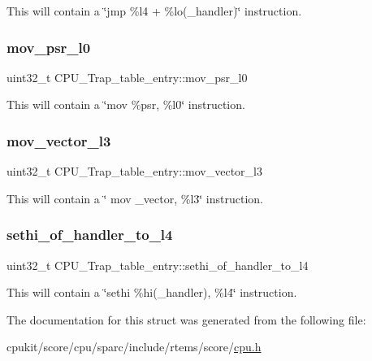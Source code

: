 This will contain a \char`\"{}jmp \%l4 + \%lo(\+\_\+handler)\char`\"{} instruction. \mbox{\label{structCPU__Trap__table__entry_a7b5bf63979937f0faab4c9c98f5e4e81}} 
\subsubsection{\texorpdfstring{mov\_psr\_l0}{mov\_psr\_l0}}
{\footnotesize\ttfamily uint32\+\_\+t C\+P\+U\+\_\+\+Trap\+\_\+table\+\_\+entry\+::mov\+\_\+psr\+\_\+l0}

This will contain a \char`\"{}mov \%psr, \%l0\char`\"{} instruction. \mbox{\label{structCPU__Trap__table__entry_a3ab22d0875a0395652bcd4e0d6955240}} 
\subsubsection{\texorpdfstring{mov\_vector\_l3}{mov\_vector\_l3}}
{\footnotesize\ttfamily uint32\+\_\+t C\+P\+U\+\_\+\+Trap\+\_\+table\+\_\+entry\+::mov\+\_\+vector\+\_\+l3}

This will contain a \char`\"{} mov \+\_\+vector, \%l3\char`\"{} instruction. \mbox{\label{structCPU__Trap__table__entry_ae8670a93c509a7ee0afe51f35edc3393}} 
\subsubsection{\texorpdfstring{sethi\_of\_handler\_to\_l4}{sethi\_of\_handler\_to\_l4}}
{\footnotesize\ttfamily uint32\+\_\+t C\+P\+U\+\_\+\+Trap\+\_\+table\+\_\+entry\+::sethi\+\_\+of\+\_\+handler\+\_\+to\+\_\+l4}

This will contain a \char`\"{}sethi \%hi(\+\_\+handler), \%l4\char`\"{} instruction. 

The documentation for this struct was generated from the following file\+:\begin{DoxyCompactItemize}
\item 
cpukit/score/cpu/sparc/include/rtems/score/\mbox{\hyperlink{sparc_2include_2rtems_2score_2cpu_8h}{cpu.\+h}}\end{DoxyCompactItemize}
